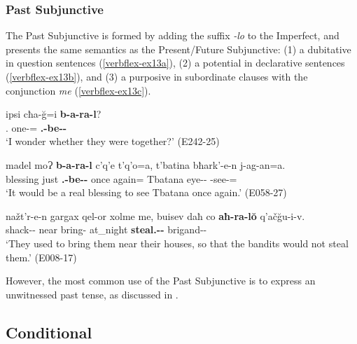\subsubsection{Past Subjunctive}

The Past Subjunctive is formed by adding the suffix \textit{-lo} to the Imperfect, and presents the same semantics as the Present/Future Subjunctive: (1) a dubitative in question sentences (\ref{verbflex-ex13a}), (2) a potential in declarative sentences (\ref{verbflex-ex13b}), and (3) a purposive in subordinate clauses with the conjunction \textit{me} (\ref{verbflex-ex13c}). 

\begin{exe}
	\ex\label{verbflex-ex13}
	\begin{xlist}
		
		\ex\label{verbflex-ex13a}
		\gll ipsi cħa-\u{g}=i \textbf{b-a-ra-l}?  \\
		{\Med}.{\Pl} one-{\Trans}={\Q} \textbf{{\M}.{\Pl}-be-{\Imprf}-{\Sbjv}} \\
		\trans `I wonder whether they were together?'
		\hfill (E242-25)
		
		\ex\label{verbflex-ex13b}
		\gll madel moɁ \textbf{b-a-ra-l} c'q'e t'q'o=a, t'batina bħark'-e-n j-ag-an=a. \\
		blessing just \textbf{{\B}.{\Sg}-be-{\Imprf}-{\Sbjv}} once again={\Emph} Tbatana eye-{\Obl}-{\Dat} {\J}-see-{\Inf}={\Emph}\\
		\trans `It would be a real blessing to see Tbatana once again.'
		\hfill (E058-27)
		
		\ex\label{verbflex-ex13c}
		\gll  nažt'r-e-n gargax qel-or xolme me, buisev daħ co \textbf{aħ-ra-l\u{o}} q'ač\u{g}u-i-v. \\
		shack-{\Obl}-{\Dat} near bring-{\Imprf} {\Hab} {\Subord} at\_night {\Pv} {\Neg} \textbf{steal.{\Ipfv}-{\Imprf}-{\Sbjv}} brigand-{\Pl}-{\Erg} \\
		\trans `They used to bring them near their houses, so that the bandits would not steal them.'
		\hfill (E008-17)
		
	\end{xlist}
\end{exe}

However, the most common use of the Past Subjunctive is to express an unwitnessed past tense, as discussed in .


\subsection{Conditional} \label{cond}

